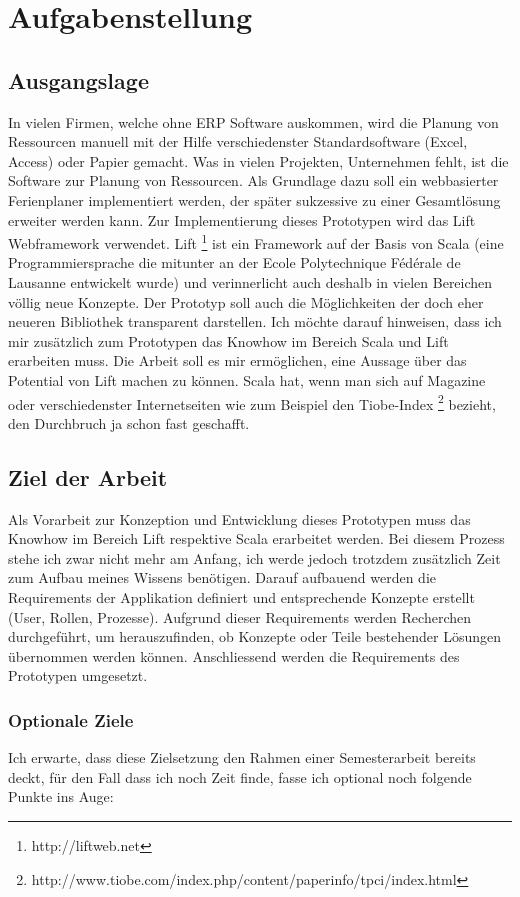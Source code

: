 \chapter{Aufgabenstellung}
\section{Ausgangslage}
In vielen Firmen, welche ohne ERP Software auskommen, wird die Planung von Ressourcen manuell mit der Hilfe verschiedenster Standardsoftware (Excel, Access) oder Papier gemacht. Was in vielen Projekten, Unternehmen fehlt, ist die Software zur Planung von Ressourcen. Als Grundlage dazu soll ein webbasierter Ferienplaner implementiert werden, der sp\"ater sukzessive zu einer Gesamtl\"osung erweiter werden kann. Zur Implementierung dieses Prototypen wird das Lift Webframework verwendet. Lift \footnote{http://liftweb.net} ist ein Framework auf der Basis von Scala (eine Programmiersprache die mitunter an der Ecole Polytechnique Fédérale de Lausanne entwickelt wurde) und verinnerlicht auch deshalb in vielen Bereichen v\"ollig neue Konzepte. Der Prototyp soll auch die M\"oglichkeiten der doch eher neueren Bibliothek transparent darstellen. Ich m\"ochte darauf hinweisen, dass ich mir zus\"atzlich zum Prototypen das Knowhow im Bereich Scala und Lift erarbeiten muss. Die Arbeit soll es mir erm\"oglichen, eine Aussage \"uber das Potential von Lift machen zu k\"onnen. Scala hat, wenn man sich auf Magazine oder verschiedenster Internetseiten wie zum Beispiel den Tiobe-Index \footnote{http://www.tiobe.com/index.php/content/paperinfo/tpci/index.html} bezieht, den Durchbruch ja schon fast geschafft. 

\section{Ziel der Arbeit}
Als Vorarbeit zur Konzeption und Entwicklung dieses Prototypen muss das Knowhow im Bereich Lift respektive Scala erarbeitet werden. Bei diesem Prozess stehe ich zwar nicht mehr am Anfang, ich werde jedoch trotzdem zus\"atzlich Zeit zum Aufbau meines Wissens ben\"otigen. Darauf aufbauend werden die Requirements der Applikation definiert und entsprechende Konzepte erstellt (User, Rollen, Prozesse). Aufgrund dieser Requirements werden Recherchen durchgef\"uhrt, um herauszufinden, ob Konzepte oder Teile bestehender L\"osungen \"ubernommen werden k\"onnen. Anschliessend werden die Requirements des Prototypen umgesetzt. 

\subsection{Optionale Ziele}
Ich erwarte, dass diese Zielsetzung den Rahmen einer Semesterarbeit bereits deckt, f\"ur den Fall dass ich noch Zeit finde, fasse ich optional noch folgende Punkte ins Auge: 

